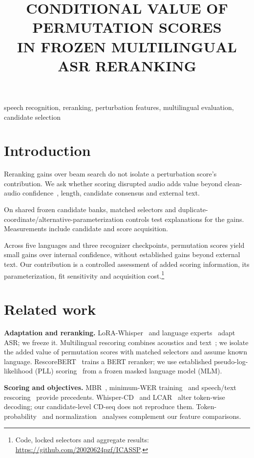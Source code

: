 \documentclass{article}
\title{CONDITIONAL VALUE OF PERMUTATION SCORES\\IN FROZEN MULTILINGUAL ASR RERANKING}
\begin{document}
\ninept
\maketitle
\begingroup
\renewcommand{\thefootnote}{\fnsymbol{footnote}}
\endgroup
\begin{abstract}\end{abstract}
\begin{keywords}speech recognition, reranking, perturbation features, multilingual evaluation, candidate selection\end{keywords}
\section{Introduction}
Reranking gains over beam search do not isolate a perturbation score's contribution. We ask whether scoring disrupted audio adds value beyond clean-audio confidence~\cite{jiang2005}, length, candidate consensus and external text.

On shared frozen candidate banks, matched selectors and duplicate-coordinate/alternative-parameterization controls test explanations for the gains. Measurements include candidate and score acquisition.

Across five languages and three recognizer checkpoints, permutation scores yield small gains over internal confidence, without established gains beyond external text. Our contribution is a controlled assessment of added scoring information, its parameterization, fit sensitivity and acquisition cost.\footnote{Code, locked selectors and aggregate results: \url{https://github.com/20020624pzf/ICASSP}.}

\section{Related work}
\textbf{Adaptation and reranking.} LoRA-Whisper~\cite{lorawhisper} and language experts~\cite{loraexperts} adapt ASR; we freeze it. Multilingual rescoring combines acoustics and text~\cite{gaur2022,yan2025wild}; we isolate the added value of permutation scores with matched selectors and assume known language. RescoreBERT~\cite{rescorebert} trains a BERT reranker; we use established pseudo-log-likelihood (PLL) scoring~\cite{mlmscoring} from a frozen masked language model (MLM).

\textbf{Scoring and objectives.} MBR~\cite{goel2000mbr}, minimum-WER training~\cite{mwer} and speech/text rescoring~\cite{rescoring} provide precedents. Whisper-CD~\cite{whispercd} and LCAR~\cite{lcar} alter token-wise decoding; our candidate-level CD-seq does not reproduce them. Token-probability~\cite{beyondwer} and normalization~\cite{normalization} analyses complement our feature comparisons.
\end{document}
